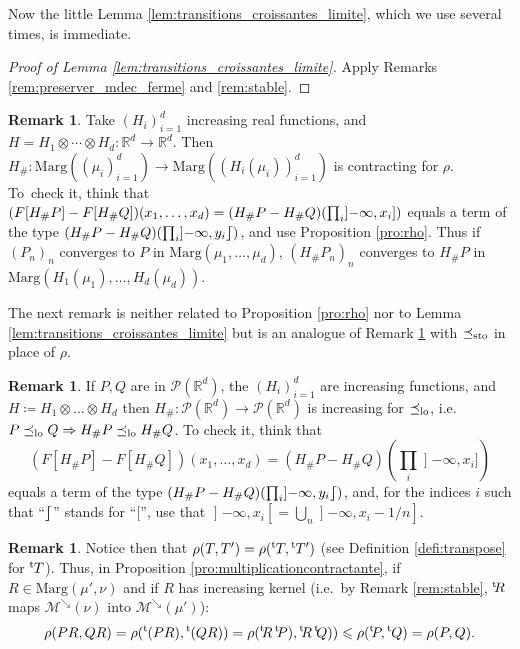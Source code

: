 \documentclass[10pt,a4paper]{article}
\providecommand{\ie}{i.e.\ }
\theoremstyle{plain}
\theoremstyle{definition}
\newtheorem{rem}[them]{Remark}
\newcommand{\trans}{{}^{\mathrm{t}}\mkern-1mu}
\newcommand{\eqdef}{\coloneqq}
\newcommand{\p}{\mathcal{P}}
\newcommand{\ma}{\mathrm{Marg}}
\newcommand{\R}{\mathbb{R}}
\newcommand{\leqs}{\preceq_{\text{\rm sto}}}
\newcommand{\mdec}{\mathcal{M}^{\scriptscriptstyle\searrow}}
\newcommand{\op}{\mathopen}
\newcommand{\clo}{\mathclose}
\newcommand{\leqlc}{\preceq_{\rm lo}}
\newcommand{\rsemibracket}{\mathclose{\rfloor\hspace*{-.9ex}\lceil}}
\begin{document}
Now the little Lemma \ref{lem:transitions_croissantes_limite}, which we use several times, is immediate.

\begin{proof}[Proof of Lemma \ref{lem:transitions_croissantes_limite}]\label{proof:lem:transitions_croissantes_limite} Apply Remarks \ref{rem:preserver_mdec_ferme} and \ref{rem:stable}.
\end{proof}

\begin{rem}\label{rem:diese_contractant} Take $(H_i)_{i=1}^d$ increasing real functions, and $H=H_1\otimes\cdots\otimes H_d:\R^d\to\R^d$. Then $H_\#:\ma((\mu_i)_{i=1}^d )\to\ma((H_i(\mu_i))_{i=1}^d)$ is contracting for $\rho$. To~check it, think that $(F[H_\#P]-F[H_\#Q])(x_1,\ldots,x_d)=(H_\#P\linebreak[2]-H_\#Q)(\prod_i\op]-\infty,x_i])$ equals a term of the type $(H_\#P-H_\#Q)(\prod_i\op]-\infty,y_i\rsemibracket)$, and use Proposition \ref{pro:rho}. Thus if $(P_n)_n$ converges to $P$ in $\ma(\mu_1,\ldots,\mu_d)$, $(H_\#P_n)_n$ converges to $H_\#P$ in $\ma(H_1(\mu_1),\ldots, H_d(\mu_d))$.
\end{rem}

The next remark is neither related to Proposition \ref{pro:rho} nor to Lemma \ref{lem:transitions_croissantes_limite} but is an analogue of Remark \ref{rem:diese_contractant} with $\leqs$ in place of $\rho$.

\begin{rem}\label{rem:leqlc_et_Gs}If $P,Q$ are in $\p(\R^d)$, the $(H_i)_{i=1}^d$ are increasing functions, and $H\eqdef H_1\otimes\ldots\otimes H_d$ then $H_\#:\p(\R^d)\to\p(\R^d)$ is increasing for $\leqlc$, \ie $P\leqlc Q\Rightarrow H_\#P\leqlc H_\#Q$. To check it, think that\vspace*{-3pt}
\[\textstyle
(F[H_\#P]-F[H_\#Q])(x_1,\ldots,x_d)=(H_\#P-H_\#Q)(\prod_i\op]-\infty,x_i])
\]
equals a term of the type $(H_\#P-H_\#Q)(\prod_i\op]-\infty,y_i\rsemibracket)$, and, for the indices $i$ such that ``$\rsemibracket$'' stands for ``$[$'', use that $\op]-\infty,x_i\clo[=\bigcup_{n}\op]-\infty,x_i-1/n]$.
\end{rem}

\begin{rem}\label{rem:multiplicationcontractante} Notice then that $\rho(T,T')=\rho(\trans T,{\trans T'})$ (see Definition \ref{defi:transpose} for $\trans T$). Thus, in Proposition \ref{pro:multiplicationcontractante}, if $R\in\ma(\mu',\nu)$ and if $R$ has increasing kernel (\ie by Remark \ref{rem:stable}, $\trans\!R$ maps $\mdec(\nu)$ into $\mdec(\mu')$):\vspace*{-3pt}
\[\rho(PR,QR)=\rho(\trans(PR),{\trans (QR)})=\rho(\trans\!R\,\trans\!P),{\trans\!R\,\trans\!Q)})\leqslant\rho(\trans\!P,\trans Q)=\rho(P,Q).\]
\end{rem}
\end{document}
